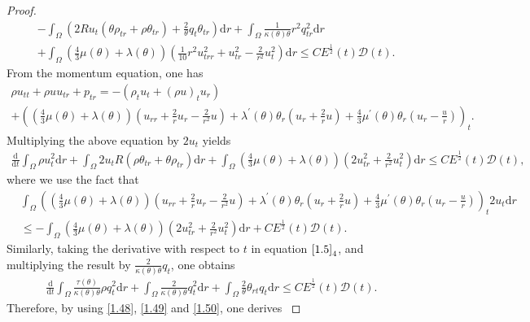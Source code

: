 \documentclass[11pt,reqno]{amsart}
\numberwithin{equation}{section}
\newcommand{\dif}{\mathrm{d}}
\begin{document}
\begin{proof}
\begin{align}
  & -\int_{\Omega}  \left(2R u_t (\theta \rho_{tr}+\rho \theta_{tr})+\frac{2}{\theta} q_t\theta_{tr}\right)\dif r
+\int_{\Omega} \frac{1}{\kappa(\theta)\theta} r^2 q_{tr}^2 \dif r  \nonumber\\
&+ \int_{\Omega} \left(\frac{4}{3} \mu(\theta)+\lambda(\theta)\right)\left(\frac{1}{10} r^2 u_{trr}^2+u_{tr}^2-\frac{2}{r^2} u_t^2\right) \dif r \le CE^\frac{1}{2}(t) \mathcal D(t). \label{1.48}
 \end{align}
 From the momentum equation, one has
 \begin{align*}
 \rho u_{tt}+\rho u u_{tr}+p_{tr}=-(\rho_t u_t+(\rho u)_t u_r) \qquad\qquad\qquad\qquad\qquad\\
+ \left(\left(\frac{4}{3} \mu(\theta)+\lambda(\theta)\right)\left(u_{rr}+\frac{2}{r}u_r-\frac{2}{r^2} u\right)+\lambda^\prime(\theta)\theta_r\left(u_r+\frac{2}{r}u\right)+\frac{4}{3}\mu^\prime(\theta) \theta_r\left(u_r-\frac{u}{r}\right)\right)_t.
 \end{align*}
 Multiplying the above equation by $2 u_t$ yields{\small
 \begin{align}\label{1.49}
 \frac{\dif}{\dif t} \int_{\Omega} \rho u_t^2\dif r+\int_{\Omega} 2 u_t R(\rho \theta_{tr}+\theta \rho_{tr})\dif r
 +\int_{\Omega} \left(\frac{4}{3} \mu(\theta)+\lambda(\theta)\right)\left(2u_{tr}^2+\frac{2}{r^2} u_t^2 \right)\dif r \le CE^\frac{1}{2}(t) \mathcal D(t),
 \end{align}}
 where we use the fact that{\small
\begin{align*}
&\int_{\Omega} \left(\left(\frac{4}{3} \mu(\theta)+\lambda(\theta)\right)\left(u_{rr}+\frac{2}{r}u_r-\frac{2}{r^2} u\right)+\lambda^\prime(\theta)\theta_r\left(u_r+\frac{2}{r}u\right)+\frac{4}{3}\mu^\prime(\theta) \theta_r\left(u_r-\frac{u}{r}\right) \right)_t2 u_t \dif r\\
&\le -\int_{\Omega} \left(\frac{4}{3} \mu(\theta)+\lambda(\theta)\right)\left(2u_{tr}^2+\frac{2}{r^2} u_t^2 \right)\dif r+CE^\frac{1}{2}(t) \mathcal D(t).
\end{align*}}
 Similarly, taking the derivative with respect to $t$ in equation $\eqref{1.5}_4$, and multiplying the result by $\frac{2}{\kappa(\theta)\theta} q_t$, one obtains
 \begin{align}\label{1.50}
 \frac{\dif}{\dif t} \int_{\Omega} \frac{\tau(\theta)}{\kappa(\theta)\theta} \rho q_t^2 \dif r+\int_{\Omega} \frac{2}{\kappa(\theta)\theta} q_t^2\dif r+\int_{\Omega} \frac{2}{\theta} \theta_{rt}q_t \dif r \le CE^\frac{1}{2}(t) \mathcal D(t).
 \end{align}
 Therefore, by using \eqref{1.48}, \eqref{1.49} and \eqref{1.50}, one derives{\small
}
\end{proof}
\end{document}
